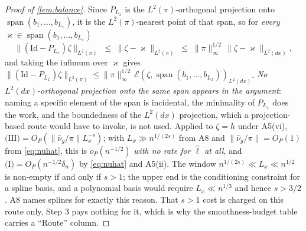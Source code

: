 \begin{proof}[Proof of \cref{lem:balance}]
Since $P_{L_x}$ is the $L^{2}(\pi)$-orthogonal projection
onto $\operatorname{span}(b_1,\dots,b_{L_x})$, it is the $L^{2}(\pi)$-nearest point of that span, so for
\emph{every} $\varkappa\in\operatorname{span}(b_1,\dots,b_{L_x})$
\[
\big\|(\mathrm{Id}-P_{L_x})\zeta\big\|_{L^{2}(\pi)}\;\le\;\big\|\zeta-\varkappa\big\|_{L^{2}(\pi)}
\;\le\;\|\pi\|_\infty^{1/2}\,\big\|\zeta-\varkappa\big\|_{L^{2}(dx)} ,
\]
and taking the infimum over $\varkappa$ gives
$\|(\mathrm{Id}-P_{L_x})\zeta\|_{L^{2}(\pi)}\le\|\pi\|_\infty^{1/2}\,
\mathcal E(\zeta,\operatorname{span}(b_1,\dots,b_{L_x}))_{L^{2}(dx)}$.
\emph{No $L^{2}(dx)$-orthogonal projection onto the same span appears in the argument}: naming a specific
element of the span is incidental, the minimality of $P_{L_x}$ does the work, and the boundedness of the
$L^{2}(dx)$ projection, which a projection-based route would have to invoke, is not used. Applied to
$\zeta=h$ under A5(vi), $\text{(III)}=O_P(\|\hat\nu_g/\pi\|L_x^{-s})$; with
$L_x\gg n^{1/(2s)}$ from A8 and $\|\hat\nu_g/\pi\|=O_P(1)$ from \eqref{eq:nuhat}, this is
$o_P(n^{-1/2})$ \emph{with no rate for $\hat\ell$ at all}, and $\text{(I)}=O_P(n^{-1/2}\delta_n)$ by
\eqref{eq:nuhat} and A5(ii). The window $n^{1/(2s)}\ll L_x\ll n^{1/2}$ is non-empty if and only if
$s>1$; the upper end is the conditioning constraint for a spline basis, and a polynomial basis would
require $L_x\ll n^{1/3}$ and hence $s>3/2$. A8 names splines for exactly this reason. That $s>1$ cost is
charged on this route only, Step 3 pays nothing for it, which is why the smoothness-budget table
carries a ``Route'' column.


\end{proof}
